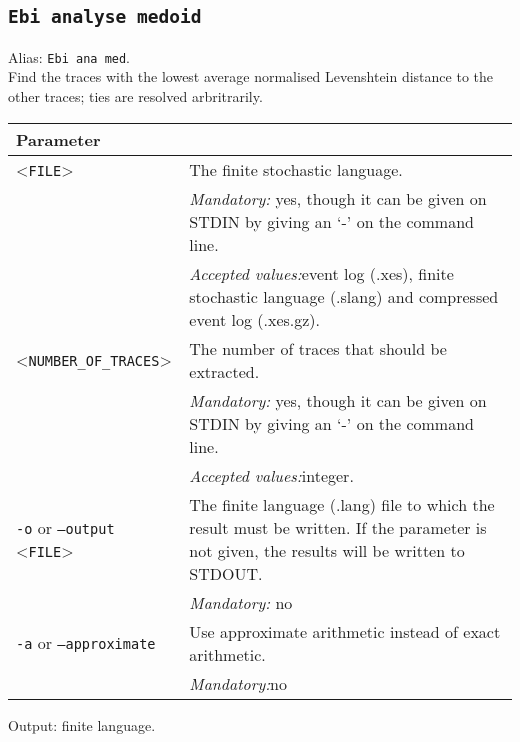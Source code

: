 {\subsection{\texttt{Ebi analyse medoid}}
\label{command:Ebi analyse medoid}
Alias: \texttt{Ebi ana med}.\\
Find the traces with the lowest average normalised Levenshtein distance to the other traces; ties are resolved arbritrarily.\\
\begin{tabularx}{\linewidth}{lX}
\toprule
Parameter \\\midrule
<\texttt{FILE}>&The finite stochastic language.\\
&\textit{Mandatory:} \quad yes, though it can be given on STDIN by giving an `-' on the command line.\\
&\textit{Accepted values:}\quad event log (.xes), finite stochastic language (.slang) and compressed event log (.xes.gz).\\
<\texttt{NUMBER\_OF\_TRACES}>&The number of traces that should be extracted.\\
&\textit{Mandatory:} \quad yes, though it can be given on STDIN by giving an `-' on the command line.\\
&\textit{Accepted values:}\quad integer.\\
\texttt{-o} or \texttt{--output} <\texttt{FILE}> &
The finite language (.lang) file to which the result must be written. If the parameter is not given, the results will be written to STDOUT.\\
&\textit{Mandatory:} \quad no\\
\texttt{-a} or \texttt{--approximate} & Use approximate arithmetic instead of exact arithmetic.\\
&\textit{Mandatory:}\quad no\\
\bottomrule
\end{tabularx}
Output: finite language.
}
